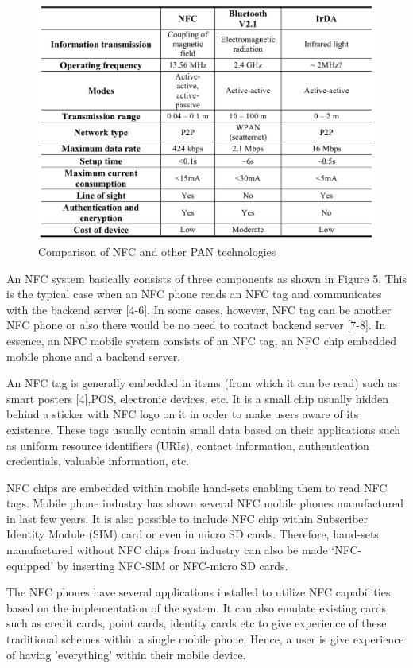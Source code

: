 \documentclass[journal]{IEEEtran}
\begin{document}
\begin{figure}[htbp]
\centerline{\includegraphics[scale=0.25]{ComparisonoNFCandotherPANtechnologies.png}}
\caption{Comparison of NFC and other PAN technologies}
\label{fig}
\end{figure}

An NFC system basically consists of three components as shown in Figure 5. This is the typical case when an NFC phone reads an NFC tag and communicates with the backend server [4-6]. In some cases, however, NFC tag can be another NFC phone or also there would be no need to contact backend server [7-8]. In essence, an NFC mobile system consists of an NFC tag, an NFC chip embedded mobile phone and a backend server.

An NFC tag is generally embedded in items (from which it can be read) such as smart posters [4],POS, electronic devices, etc. It is a small chip usually hidden behind a sticker with NFC logo on it in order to make users aware of its existence. These tags usually contain small data based on their applications such as uniform resource identifiers (URIs), contact information, authentication credentials, valuable information, etc.

NFC chips are embedded within mobile hand-sets enabling them to read NFC tags. Mobile phone industry has shown several NFC mobile phones manufactured in last few years. It is also possible to include NFC chip within Subscriber Identity Module (SIM) card or even in micro SD cards. Therefore, hand-sets manufactured without NFC chips from industry can also be made ‘NFC-equipped’ by inserting NFC-SIM or NFC-micro SD cards.

The NFC phones have several applications installed to utilize NFC capabilities based on the implementation of the system. It can also emulate existing cards such as credit cards, point cards, identity cards etc to give experience of these traditional schemes within a single mobile phone. Hence, a user is give experience of having 'everything' within their mobile device.
\end{document}
